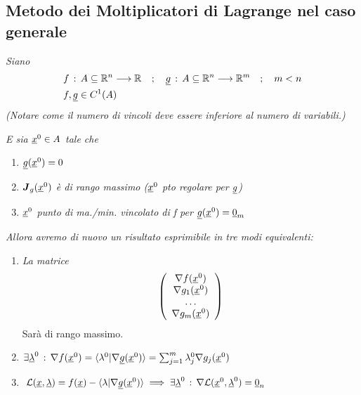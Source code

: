 \begin{figure}[!htb]
\end{figure}

\newpage

\subsection{Metodo dei Moltiplicatori di Lagrange nel caso generale}

\textit{Siano}
\begin{align}
	{}&f \, : \, A\subseteq \mathbb{R}^{n} \longrightarrow \mathbb{R}^{} \quad ; \quad \underline{g} \, : \, A\subseteq \mathbb{R}^{n} \longrightarrow \mathbb{R}^{m} \quad ; \quad m<n\\
	&f,\underline{g} \in C^1(A)
\end{align}
\textit{(Notare come il numero di vincoli deve essere inferiore al numero di variabili.)}

\textit{E sia $\underline{x}^0 \in A$ tale che}
\begin{enumerate}
	\item $\underline{g}(\underline{x}^0)=0$
	\item $\boldsymbol{J}_{g} (\underline{x}^0)$ \textit{è di rango massimo ($\underline{x}^0 $ pto regolare per $\underline{g}$)}
	\item \textit{$\underline{x}^0 $ punto di ma./min. vincolato di f per $\underline{g}(\underline{x}^0)=\underline{0}_m $}
\end{enumerate}
\textit{Allora avremo di nuovo un risultato esprimibile in tre modi equivalenti:}
\begin{enumerate}
	\item \textit{La matrice}
	\begin{align}
		\left( \begin{array}{cc} \nabla f(\underline{x}^0) \\ \nabla g_1(\underline{x}^0) \\ \dots\\ \nabla g_m(\underline{x}^0) \end{array} \right)
	\end{align}
	Sarà di rango massimo.
	\item $\exists \underline{\lambda}^0 \, : \, \nabla f(\underline{x}^0) = \braket{\lambda^0 | \nabla \underline{g}(\underline{x}^0)}=\sum_{j=1}^{m} \lambda^0_j \nabla g_j(\underline{x}^0) $
	\item $\mathcal{L}(\underline{x},\underline{\lambda}) = f(\underline{x}) - \braket{\lambda | \nabla \underline{g}(\underline{x}^0)} \implies \exists \underline{\lambda}^0 \, : \, \nabla \mathcal{L}(\underline{x}^0,\underline{\lambda}^0)=\underline{0}_n$
\end{enumerate}

